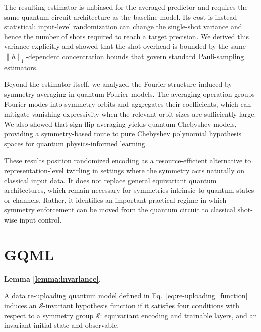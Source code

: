 \documentclass[%
 reprint,
 amsmath,amssymb,
 aps,
 pra,
]{revtex4-2}
\theoremstyle{definition}
\newenvironment{restate}[2]{%
  \par\noindent\textbf{#1 \ref{#2}. }\itshape%
}{\par\medskip}
\begin{document}
The resulting estimator is unbiased for the averaged predictor and requires the same quantum circuit architecture as the baseline model. Its cost is instead statistical: input-level randomization can change the single-shot variance and hence the number of shots required to reach a target precision. We derived this variance explicitly and showed that the shot overhead is bounded by the same \(\|h\|_1\)-dependent concentration bounds that govern standard Pauli-sampling estimators.

Beyond the estimator itself, we analyzed the Fourier structure induced by symmetry averaging in quantum Fourier models. The averaging operation groups Fourier modes into symmetry orbits and aggregates their coefficients, which can mitigate vanishing expressivity when the relevant orbit sizes are sufficiently large. We also showed that sign-flip averaging yields quantum Chebyshev models, providing a symmetry-based route to pure Chebyshev polynomial hypothesis spaces for quantum physics-informed learning.

These results position randomized encoding as a resource-efficient alternative to representation-level twirling in settings where the symmetry acts naturally on classical input data. It does not replace general equivariant quantum architectures, which remain necessary for symmetries intrinsic to quantum states or channels. Rather, it identifies an important practical regime in which symmetry enforcement can be moved from the quantum circuit to classical shot-wise input control.

\begin{acknowledgments}
\end{acknowledgments}



\clearpage
\onecolumngrid
\appendix

\section{GQML}
\label{sec:invariance}

\begin{restate}{Lemma}{lemma:invariance}
A data re-uploading quantum model defined in Eq.~\eqref{eq:re-uploading_function} induces an \(\mathcal{S}\)-invariant hypothesis function if it satisfies four conditions with respect to a symmetry group \(\mathcal{S}\): equivariant encoding and trainable layers, and an invariant initial state and observable.
\end{restate}
\end{document}
